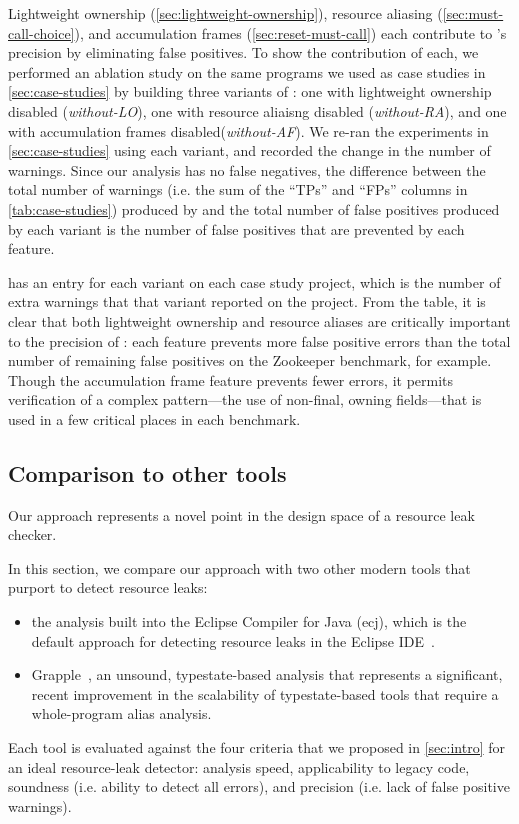 Lightweight ownership (\cref{sec:lightweight-ownership}),
resource aliasing (\cref{sec:must-call-choice}), and
accumulation frames (\cref{sec:reset-must-call})
each contribute to \Tool's precision by eliminating false positives.
To show the contribution of each,
we performed an ablation study on the same programs we used as case studies in
\cref{sec:case-studies} by building three variants of \Tool:
one with lightweight ownership disabled (\emph{without-LO}),
one with resource aliaisng disabled (\emph{without-RA}),
and one with accumulation frames disabled(\emph{without-AF}).
We re-ran the experiments in \cref{sec:case-studies} using each variant, and
recorded the change in the number of warnings. Since our analysis has no false
negatives, the difference between the total number of warnings (i.e. the sum of
the ``TPs'' and ``FPs'' columns in \cref{tab:case-studies}) produced by \Tool
and the total number of false positives produced by each variant is
the number of false positives that are prevented by each feature.

 has an entry for each variant on each case study project,
which is the number of extra warnings that that variant reported on the project.
From the table, it is clear that both lightweight
ownership and resource aliases are critically important to the precision of
\Tool: each feature prevents more false positive errors than the total number
of remaining false positives on the Zookeeper benchmark, for example.  Though
the accumulation frame feature prevents fewer errors, it permits verification
of a complex pattern---the use of non-final, owning fields---that is used in a
few critical places in each benchmark.

\subsection{Comparison to other tools}
\label{sec:compare}

Our approach represents a novel point in the design space of a resource leak checker.

In this section, we compare our approach with two other modern tools that purport to detect resource leaks:
\begin{itemize}
\item the analysis built into the Eclipse Compiler for Java (ecj), which is the default approach
  for detecting resource leaks in the Eclipse IDE~\cite{ecj-resource-leak}.
\item Grapple~\cite{zuo2019grapple}, an unsound, typestate-based analysis that represents a significant, recent
  improvement in the scalability of typestate-based tools that require a whole-program alias analysis.
\end{itemize}
Each tool is evaluated against the four criteria that we proposed in \cref{sec:intro}
for an ideal resource-leak detector: analysis speed, applicability to legacy code, soundness (i.e. ability
to detect all errors), and precision (i.e. lack of false positive warnings).

